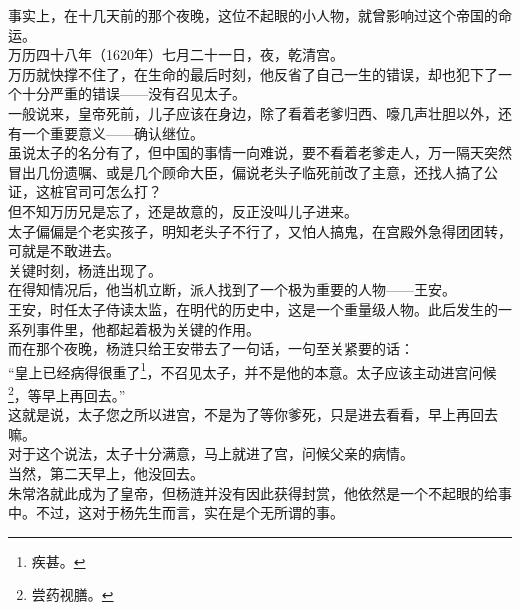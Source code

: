 \begin{multicols}{\theparacolNo}
事实上，在十几天前的那个夜晚，这位不起眼的小人物，就曾影响过这个帝国的命运。\\

万历四十八年（1620年）七月二十一日，夜，乾清宫。\\

万历就快撑不住了，在生命的最后时刻，他反省了自己一生的错误，却也犯下了一个十分严重的错误——没有召见太子。\\

一般说来，皇帝死前，儿子应该在身边，除了看着老爹归西、嚎几声壮胆以外，还有一个重要意义——确认继位。\\

虽说太子的名分有了，但中国的事情一向难说，要不看着老爹走人，万一隔天突然冒出几份遗嘱、或是几个顾命大臣，偏说老头子临死前改了主意，还找人搞了公证，这桩官司可怎么打？\\

但不知万历兄是忘了，还是故意的，反正没叫儿子进来。\\

太子偏偏是个老实孩子，明知老头子不行了，又怕人搞鬼，在宫殿外急得团团转，可就是不敢进去。\\

关键时刻，杨涟出现了。\\

在得知情况后，他当机立断，派人找到了一个极为重要的人物——王安。\\

王安，时任太子侍读太监，在明代的历史中，这是一个重量级人物。此后发生的一系列事件里，他都起着极为关键的作用。\\

而在那个夜晚，杨涟只给王安带去了一句话，一句至关紧要的话：\\

“皇上已经病得很重了\footnote{疾甚。}，不召见太子，并不是他的本意。太子应该主动进宫问候\footnote{尝药视膳。}，等早上再回去。”\\

这就是说，太子您之所以进宫，不是为了等你爹死，只是进去看看，早上再回去嘛。\\

对于这个说法，太子十分满意，马上就进了宫，问候父亲的病情。\\

当然，第二天早上，他没回去。\\

朱常洛就此成为了皇帝，但杨涟并没有因此获得封赏，他依然是一个不起眼的给事中。不过，这对于杨先生而言，实在是个无所谓的事。\\


\end{multicols}

